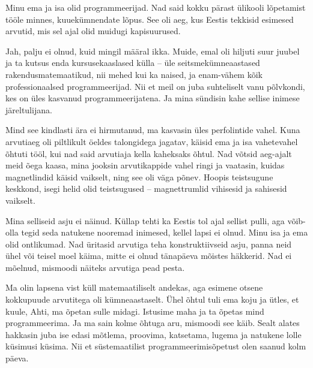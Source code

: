 \label{sisu:ahti}

Minu ema ja isa olid 
programmeerijad. Nad said kokku pärast ülikooli lõpetamist tööle minnes, 
kuuekümnendate lõpus. See oli aeg, kus Eestis tekkisid 
esimesed arvutid, mis sel ajal olid muidugi kapisuurused.


Jah, palju ei olnud, kuid 
mingil määral ikka. Muide, emal oli hiljuti  
suur juubel ja ta kutsus enda 
kursusekaaslased külla – üle seitsmekümneaastased
rakendusmatemaatikud, nii mehed kui ka naised, ja enam-vähem kõik  
professionaalsed programmeerijad. Nii et meil on juba 
suhteliselt vanu põlvkondi, kes on üles kasvanud programmeerijatena. Ja mina 
sündisin kahe sellise inimese järeltulijana.


Mind see kindlasti ära ei hirmutanud, ma kasvasin üles perfolintide vahel. 
Kuna arvutiaeg oli piltlikult öeldes talongidega 
jagatav, käisid ema ja isa vahetevahel
õhtuti tööl, kui nad said arvutiaja kella kaheksaks õhtul. 
Nad võtsid aeg-ajalt meid õega kaasa, mina jooksin arvutikappide vahel ringi ja 
vaatasin, kuidas 
magnetlindid käisid vaikselt, ning see oli väga põnev. 
Hoopis teistsugune keskkond, isegi helid olid teistsugused – magnettrumlid 
vihisesid ja sahisesid vaikselt.


Mina selliseid asju ei näinud. Küllap tehti ka Eestis tol ajal 
sellist pulli, aga võib-olla tegid seda natukene nooremad inimesed, kellel 
lapsi ei olnud. Minu isa ja ema olid ontlikumad. Nad 
üritasid arvutiga teha konstruktiivseid asju, panna neid 
ühel või teisel moel käima, mitte ei olnud tänapäeva mõistes häkkerid. Nad ei 
mõelnud, mismoodi näiteks arvutiga pead pesta.


Ma olin lapsena vist küll matemaatiliselt andekas, aga esimene otsene kokkupuude
arvutitega oli kümneaastaselt. Ühel õhtul tuli ema koju ja 
ütles, et kuule, Ahti, ma õpetan sulle midagi. Istusime maha ja 
ta õpetas mind programmeerima. Ja ma sain 
kolme õhtuga aru, mismoodi see käib. Sealt 
alates hakkasin juba ise edasi mõtlema, proovima, katsetama, lugema ja 
natukene lolle küsimusi küsima. Nii et süstemaatilist 
programmeerimisõpetust olen saanud kolm päeva.

